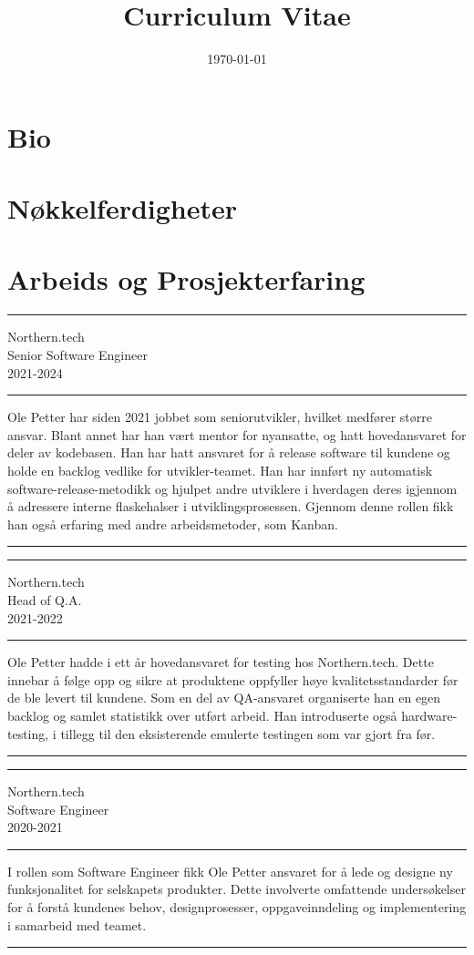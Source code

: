 \documentclass[11pt]{article}
\date{\today}
\title{Curriculum Vitae}
\newenvironment*{experience}[3]{
  \par\noindent\rule{\textwidth}{0.4pt}
  #1 \\
  #2 \\
  #3 \\
  \par\noindent\rule{\textwidth}{0.4pt}
}
{\par\noindent\rule{\textwidth}{0.4pt}} %
\begin{document}
\section{Bio}

\section{Nøkkelferdigheter}

\section{Arbeids og Prosjekterfaring}

\begin{experience}{Northern.tech}{Senior Software Engineer}{2021-2024}
  Ole Petter har siden 2021 jobbet som seniorutvikler, hvilket medfører større
  ansvar. Blant annet har han vært mentor for nyansatte, og hatt hovedansvaret
  for deler av kodebasen. Han har hatt ansvaret for å release software til
  kundene og holde en backlog vedlike for utvikler-teamet. Han har innført ny
  automatisk software-release-metodikk og hjulpet andre utviklere i hverdagen
  deres igjennom å adressere interne flaskehalser i utviklingsprosessen. Gjennom
  denne rollen fikk han også erfaring med andre arbeidsmetoder, som Kanban.
\end{experience}

\begin{experience}{Northern.tech}{Head of Q.A.}{2021-2022}
  Ole Petter hadde i ett år hovedansvaret for testing hos Northern.tech. Dette innebar å følge opp og sikre at
  produktene oppfyller høye kvalitetsstandarder før de ble levert til kundene. Som en del av QA-ansvaret organiserte
  han en egen backlog og samlet statistikk over utført arbeid. Han introduserte også hardware-testing, i tillegg til den
  eksisterende emulerte testingen som var gjort fra før.
\end{experience}

\begin{experience}{Northern.tech}{Software Engineer}{2020-2021}

  I rollen som Software Engineer fikk Ole Petter ansvaret for å lede og designe ny
  funksjonalitet for selskapets produkter. Dette involverte omfattende
  undersøkelser for å forstå kundenes behov, designprosesser, oppgaveinndeling og
  implementering i samarbeid med teamet.

\end{experience}
\end{document}
